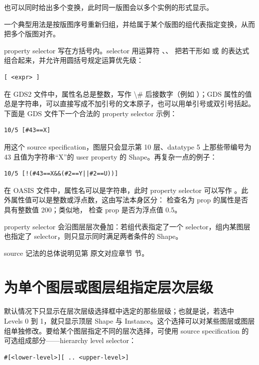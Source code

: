 也可以同时给出多个变换，此时同一版图会以多个实例的形式显示。

一个典型用法是按版图序号重新归组，并给属于某个版图的组代表指定变换，从而把多个版图对齐。

property selector 写在方括号内。selector 用运算符 \kte{\&\&}、\kte{||}、\kte{!} 把若干形如  或  的表达式组合起来，并允许用圆括号规定运算优先级：

\begin{lstlisting}
[ <expr> ]
\end{lstlisting}

在 GDS2 文件中，属性名总是整数，写作 \textbackslash{}\# 后接数字（例如 ）；GDS 属性的值总是字符串，可以直接写成不加引号的文本原子，也可以用单引号或双引号括起。下面是 GDS 文件下一个合法的 property selector 示例：

\begin{lstlisting}
10/5 [#43==X]
\end{lstlisting}

用这个 source specification，图层只会显示第 10 层、datatype 5 上那些带编号为 43 且值为字符串“X”的 user property 的 Shape。再复杂一点的例子：

\begin{lstlisting}
10/5 [!(#43==X&&(#2==Y||#2==U))]
\end{lstlisting}

在 OASIS 文件中，属性名可以是字符串，此时 property selector 可以写作 \ui{[prop==X]}。此外属性值可以是整数或浮点数，这由写法本身区分：\ui{[prop==\#200]} 检查名为 prop 的属性是否具有整数值 200；类似地，\ui{[prop==\#\#0.5]} 检查 prop 是否为浮点值 0.5。

property selector 会沿图层层次叠加：若组代表指定了一个 selector，组内某图层也指定了 selector，则只显示同时满足两者条件的 Shape。

source 记法的总体说明见第 原文对应章节 节。

\section{为单个图层或图层组指定层次层级}\label{sec:explicit_hier_levels}

默认情况下只显示在层次层级选择框中选定的那些层级；也就是说，若选中 Levels 0 到 1，就只显示顶层 Shape 与 Instance。这个选择可以对某些图层或图层组单独修改。要给某个图层指定不同的层次选择，可使用 source specification 的可选组成部分——hierarchy level selector：

\begin{lstlisting}
#[<lower-level>][ .. <upper-level>]
\end{lstlisting}

